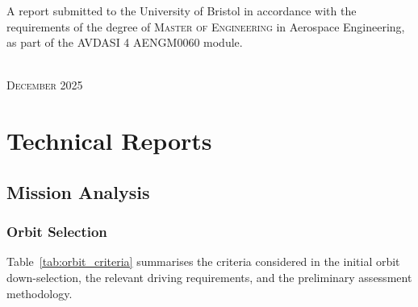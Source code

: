 \documentclass[a4paper, 11pt, conference]{IEEEtran}
\begin{document}
\begin{titlepage}
\begin{center}
\begin{minipage}{11.2cm}
			A report submitted to the University of Bristol in accordance with the requirements of the degree of \textsc{Master of Engineering} in Aerospace Engineering, as part of the \textsc{AVDASI 4 AENGM0060} module.
		\end{minipage}\\
		\vspace{11mm}
		{\large\textsc{December 2025}}
		\vspace{3mm}
	\end{center}

	\vspace{2mm}


\end{titlepage}
\section{Technical Reports}
\subsection{Mission Analysis}
\label{sub:Miss_Anal_TR}
\subsubsection{Orbit Selection}

Table~\ref{tab:orbit_criteria} summarises the criteria considered in the initial orbit down-selection, the relevant driving requirements, and the preliminary assessment methodology. 
\end{document}
